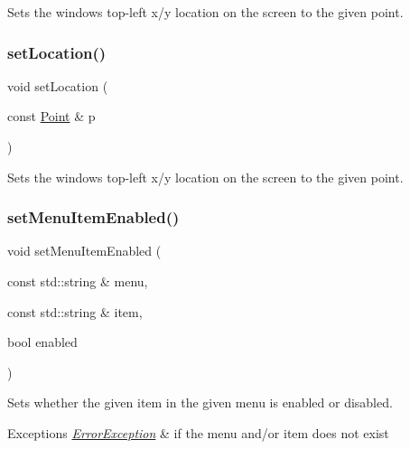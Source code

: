 Sets the window\textquotesingle{}s top-\/left x/y location on the screen to the given point. 

\mbox{\label{classGWindow_a87e01677a5e66337a16b60524e3796ab}} 
\subsubsection{\texorpdfstring{set\+Location()}{setLocation()}\hspace{0.1cm}{\footnotesize\ttfamily [3/3]}}
{\footnotesize\ttfamily void set\+Location (\begin{DoxyParamCaption}\item[{const \mbox{\hyperlink{classPoint}{Point}} \&}]{p }\end{DoxyParamCaption})\hspace{0.3cm}{\ttfamily [virtual]}}



Sets the window\textquotesingle{}s top-\/left x/y location on the screen to the given point. 

\mbox{\label{classGWindow_a875124740630bebec069479fd3958efc}} 
\subsubsection{\texorpdfstring{set\+Menu\+Item\+Enabled()}{setMenuItemEnabled()}}
{\footnotesize\ttfamily void set\+Menu\+Item\+Enabled (\begin{DoxyParamCaption}\item[{const std\+::string \&}]{menu,  }\item[{const std\+::string \&}]{item,  }\item[{bool}]{enabled }\end{DoxyParamCaption})\hspace{0.3cm}{\ttfamily [virtual]}}



Sets whether the given item in the given menu is enabled or disabled. 


\begin{DoxyExceptions}{Exceptions}
{\em \mbox{\hyperlink{classErrorException}{Error\+Exception}}} & if the menu and/or item does not exist \\
\hline
\end{DoxyExceptions}
\mbox{\label{classGWindow_ab0002e0bf6566a5b98cc9128cb859b0e}} 
